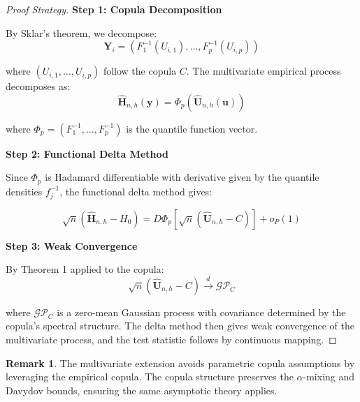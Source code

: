 \documentclass[12pt]{article}
\theoremstyle{plain}
\theoremstyle{definition}
\newtheorem{remark}[theorem]{Remark}
\newcommand{\dto}{\xrightarrow{d}}
\newcommand{\1}[1]{\mathbf{1}_{#1}}
\begin{document}
\begin{proof}[Proof Strategy]

\medskip

\noindent \textbf{Step 1: Copula Decomposition}

By Sklar's theorem, we decompose:
\begin{equation}
\mathbf{Y}_i = (F_1^{-1}(U_{i,1}), \ldots, F_p^{-1}(U_{i,p}))
\end{equation}

where $(U_{i,1}, \ldots, U_{i,p})$ follow the copula $C$. The multivariate empirical process decomposes as:
\begin{equation}
\widehat{\mathbf{H}}_{n,h}(\mathbf{y}) = \Phi_p(\widehat{\mathbf{U}}_{n,h}(\mathbf{u}))
\end{equation}

where $\Phi_p = (F_1^{-1}, \ldots, F_p^{-1})$ is the quantile function vector.

\medskip

\noindent \textbf{Step 2: Functional Delta Method}

Since $\Phi_p$ is Hadamard differentiable with derivative given by the quantile densities $f_j^{-1}$, the functional delta method \citep{vdVW96} gives:

\begin{equation}
\sqrt{n}(\widehat{\mathbf{H}}_{n,h} - H_0) = D\Phi_p[\sqrt{n}(\widehat{\mathbf{U}}_{n,h} - C)] + o_P(1)
\end{equation}

\medskip

\noindent \textbf{Step 3: Weak Convergence}

By Theorem 1 applied to the copula:
\begin{equation}
\sqrt{n}(\widehat{\mathbf{U}}_{n,h} - C) \dto \mathcal{GP}_C
\end{equation}

where $\mathcal{GP}_C$ is a zero-mean Gaussian process with covariance determined by the copula's spectral structure. The delta method then gives weak convergence of the multivariate process, and the test statistic follows by continuous mapping.

\end{proof}

\begin{remark}
The multivariate extension avoids parametric copula assumptions by leveraging the empirical copula. The copula structure preserves the $\alpha$-mixing and Davydov bounds, ensuring the same asymptotic theory applies.
\end{remark}
\end{document}
